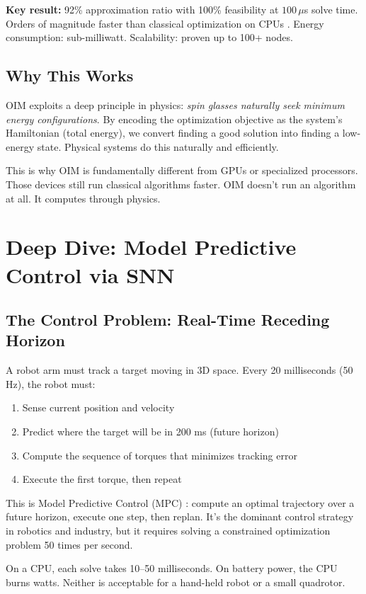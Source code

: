 \textbf{Key result:} 92\% approximation ratio with 100\% feasibility at $100\,\mu$s solve time. Orders of magnitude faster than classical optimization on CPUs \cite{Bifrost2021}. Energy consumption: sub-milliwatt. Scalability: proven up to 100+ nodes.

\subsection{Why This Works}

OIM exploits a deep principle in physics: \textit{spin glasses naturally seek minimum energy configurations}. By encoding the optimization objective as the system's Hamiltonian (total energy), we convert finding a good solution into finding a low-energy state. Physical systems do this naturally and efficiently.

This is why OIM is fundamentally different from GPUs or specialized processors. Those devices still run classical algorithms faster. OIM doesn't run an algorithm at all. It computes through physics.

\section{Deep Dive: Model Predictive Control via SNN}

\subsection{The Control Problem: Real-Time Receding Horizon}

A robot arm must track a target moving in 3D space. Every 20 milliseconds (50 Hz), the robot must:
\begin{enumerate}
\item Sense current position and velocity
\item Predict where the target will be in 200 ms (future horizon)
\item Compute the sequence of torques that minimizes tracking error
\item Execute the first torque, then repeat
\end{enumerate}

This is Model Predictive Control (MPC) \cite{Rawlings2020}: compute an optimal trajectory over a future horizon, execute one step, then replan. It's the dominant control strategy in robotics and industry, but it requires solving a constrained optimization problem 50 times per second.

On a CPU, each solve takes 10--50 milliseconds. On battery power, the CPU burns watts. Neither is acceptable for a hand-held robot or a small quadrotor.

